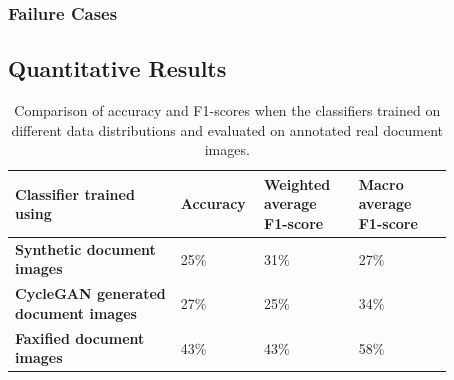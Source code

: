 \subsubsection{Failure Cases}\label{FailureCases}




\subsection{Quantitative Results}

\begin{center}
\begin{table}[H]
    \begin{center}
    \begin{tabular}{P{0.35\linewidth} P{0.12\linewidth} P{0.20\linewidth} P{0.20\linewidth}} 
        \toprule
        \bf{Classifier trained using} & \bf{Accuracy}  & \bf{Weighted average F1-score} & \bf{Macro average F1-score} \\[0.0ex] 
	 \midrule
        \bf{Synthetic document images} & 25\% & 31\% & 27\%\\[0.0ex]
        \midrule
       \bf{\ac{CycleGAN} generated document images} & 27\% & 25\% & 34\%\\[0.0ex]
        \midrule
        \bf{Faxified document images} & 43\% & 43\% & 58\%\\[0.0ex]
        \bottomrule
    \end{tabular}
    \caption[Comparison of accuracy and F1-scores when the classifiers trained on different data distributions and evaluated on annotated real document images.]{Comparison of accuracy and F1-scores when the classifiers trained on different data distributions and evaluated on annotated real document images.}
    \label{table:finalResults}
    \end{center}
\end{table}
\end{center}





